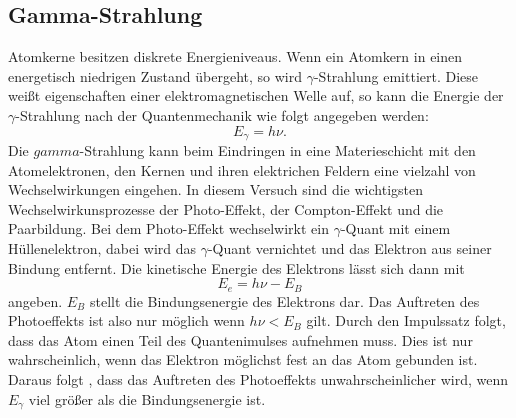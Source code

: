 \subsection{Gamma-Strahlung}
Atomkerne besitzen diskrete Energieniveaus.
Wenn ein Atomkern in einen energetisch niedrigen Zustand übergeht, so wird $\gamma$-Strahlung emittiert.
Diese weißt eigenschaften einer elektromagnetischen Welle auf, so kann die Energie der $\gamma$-Strahlung
nach der Quantenmechanik wie folgt angegeben werden:
\begin{equation}
  E_\gamma = h\nu  .
\end{equation}
Die $gamma$-Strahlung kann beim Eindringen in eine Materieschicht mit den Atomelektronen, den Kernen und ihren elektrichen Feldern eine vielzahl von Wechselwirkungen eingehen.
In diesem Versuch sind die wichtigsten Wechselwirkunsprozesse der Photo-Effekt, der Compton-Effekt und die Paarbildung.
Bei dem Photo-Effekt wechselwirkt ein $\gamma$-Quant mit einem Hüllenelektron, dabei wird das $\gamma$-Quant vernichtet und das Elektron aus seiner Bindung entfernt.
Die kinetische Energie des Elektrons lässt sich dann mit
\begin{equation}
  E_e = h\nu - E_B
\end{equation}
angeben.
$E_B$ stellt die Bindungsenergie des Elektrons dar.
Das Auftreten des Photoeffekts ist also nur möglich wenn $h\nu < E_B$ gilt.
Durch den Impulssatz folgt, dass das Atom einen Teil des Quantenimulses aufnehmen muss.
Dies ist nur wahrscheinlich, wenn das Elektron möglichst fest an das Atom gebunden ist.
Daraus folgt , dass das Auftreten des Photoeffekts unwahrscheinlicher wird, wenn $E_\gamma$  viel größer als die Bindungsenergie ist.

